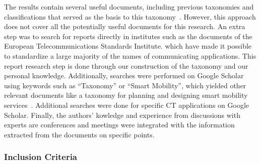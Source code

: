 The results contain several useful documents, including previous taxonomies and classifications that served as the basis to this taxonomy~\cite{papadimitratos_vehicular_2009}. However, this approach does not cover all the potentially useful documents for this research.  %
An extra step was to search for reports directly in institutes such as the documents of the European Telecommunications Standards Institute. \cite{etsi_etsi_tr_102_638_intelligent_2009} which have made it possible to standardize a large majority of the names of communicating applications. This report research step is done through our construction of the taxonomy and our personal knowledge. 
Additionally, searches were performed on Google Scholar using keywords such as ``Taxonomy'' or ``Smart Mobility'', which yielded other relevant documents like a taxonomy for planning and designing smart mobility services~\cite{cledou_taxonomy_2018}. Additional searches were done for specific \acrshort{CT} applications on Google Scholar. 
Finally, the authors' kowledge and experience from discussions with experts are conferences and meetings were integrated with the information extracted from the documents on specific points. 

\subsubsection{Inclusion Criteria} 

